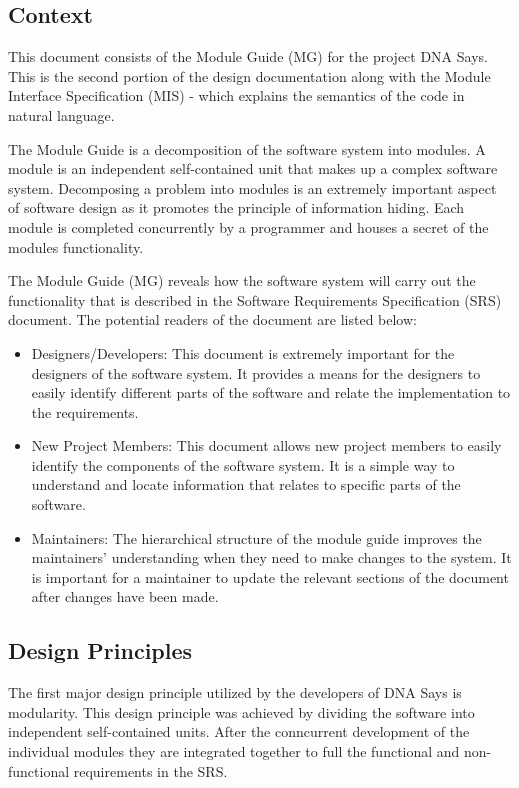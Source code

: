 \documentclass[12pt, titlepage]{article}
\begin{document}
\subsection{Context}
\par This document consists of the Module Guide (MG) for the project DNA Says. This is the second portion of the design documentation along with the Module Interface Specification (MIS) - which explains the semantics of the code in natural language. \\
\par The Module Guide is a decomposition of the software system into modules. A module is an independent self-contained unit that makes up a complex software system. Decomposing a problem into modules is an extremely important aspect of software design as it promotes the principle of information hiding. Each module is completed concurrently by a programmer and houses a secret of the modules functionality.\\
\par The Module Guide (MG) reveals how the software system will carry out the functionality that is described in the Software Requirements Specification (SRS) document. The potential readers of the document are listed below:
\begin{itemize}
\item Designers/Developers: This document is extremely important for the designers of the software system. It provides a means for the designers to easily identify different parts of the software and relate the implementation to the requirements.
\item New Project Members: This document allows new project members to easily identify the components of the software system. It is a simple way to understand and locate information that relates to specific parts of the software. 
\item Maintainers: The hierarchical structure of the module guide improves the maintainers' understanding when they need to make changes to the system. It is important for a maintainer to update the relevant sections of the document after changes have been made.
\end{itemize}

\subsection{Design Principles}
\par The first major design principle utilized by the developers of DNA Says is modularity. This design principle was achieved by dividing the software into independent self-contained units. After the conncurrent development of the individual modules they are integrated together to full the functional and non-functional requirements in the SRS.\\
\end{document}
